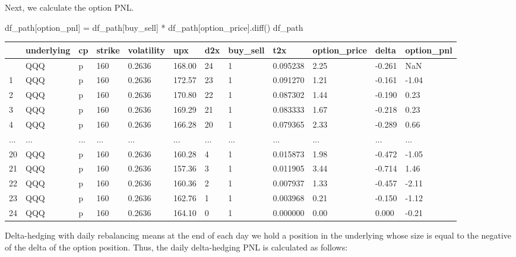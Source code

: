 \documentclass[
  letterpaper,
  DIV=11,
  numbers=noendperiod]{scrreprt}
\newenvironment{Shaded}{\begin{snugshade}}{\end{snugshade}}
\newcommand{\NormalTok}[1]{\textcolor[rgb]{0.00,0.23,0.31}{#1}}
\newcommand{\OperatorTok}[1]{\textcolor[rgb]{0.37,0.37,0.37}{#1}}
\newcommand{\StringTok}[1]{\textcolor[rgb]{0.13,0.47,0.30}{#1}}
\begin{document}
Next, we calculate the option PNL.

\begin{Shaded}
\begin{Highlighting}[]
\NormalTok{df\_path[}\StringTok{\textquotesingle{}option\_pnl\textquotesingle{}}\NormalTok{] }\OperatorTok{=}\NormalTok{ df\_path[}\StringTok{\textquotesingle{}buy\_sell\textquotesingle{}}\NormalTok{] }\OperatorTok{*}\NormalTok{ df\_path[}\StringTok{\textquotesingle{}option\_price\textquotesingle{}}\NormalTok{].diff()}
\NormalTok{df\_path}
\end{Highlighting}
\end{Shaded}

\begin{longtable}[]{@{}llllllllllll@{}}
\toprule\noalign{}
& underlying & cp & strike & volatility & upx & d2x & buy\_sell & t2x &
option\_price & delta & option\_pnl \\
\midrule\noalign{}
\endhead
\bottomrule\noalign{}
\endlastfoot
0 & QQQ & p & 160 & 0.2636 & 168.00 & 24 & 1 & 0.095238 & 2.25 & -0.261
& NaN \\
1 & QQQ & p & 160 & 0.2636 & 172.57 & 23 & 1 & 0.091270 & 1.21 & -0.161
& -1.04 \\
2 & QQQ & p & 160 & 0.2636 & 170.80 & 22 & 1 & 0.087302 & 1.44 & -0.190
& 0.23 \\
3 & QQQ & p & 160 & 0.2636 & 169.29 & 21 & 1 & 0.083333 & 1.67 & -0.218
& 0.23 \\
4 & QQQ & p & 160 & 0.2636 & 166.28 & 20 & 1 & 0.079365 & 2.33 & -0.289
& 0.66 \\
... & ... & ... & ... & ... & ... & ... & ... & ... & ... & ... & ... \\
20 & QQQ & p & 160 & 0.2636 & 160.28 & 4 & 1 & 0.015873 & 1.98 & -0.472
& -1.05 \\
21 & QQQ & p & 160 & 0.2636 & 157.36 & 3 & 1 & 0.011905 & 3.44 & -0.714
& 1.46 \\
22 & QQQ & p & 160 & 0.2636 & 160.36 & 2 & 1 & 0.007937 & 1.33 & -0.457
& -2.11 \\
23 & QQQ & p & 160 & 0.2636 & 162.76 & 1 & 1 & 0.003968 & 0.21 & -0.150
& -1.12 \\
24 & QQQ & p & 160 & 0.2636 & 164.10 & 0 & 1 & 0.000000 & 0.00 & 0.000 &
-0.21 \\
\end{longtable}

Delta-hedging with daily rebalancing means at the end of each day we
hold a position in the underlying whose size is equal to the negative of
the delta of the option position. Thus, the daily delta-hedging PNL is
calculated as follows:
\end{document}
